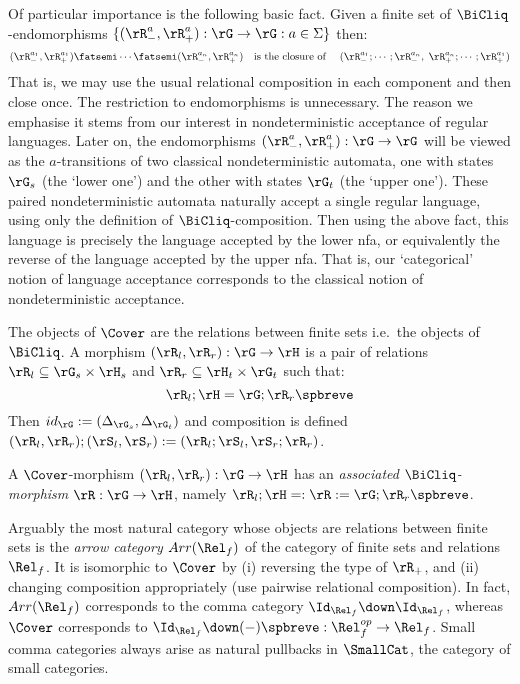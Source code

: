 \documentclass{article}
\begin{document}
\begin{motivation}
Of particular importance is the following basic fact. Given a finite set of $\BiCliq$-endomorphisms $\{ (\rR_-^a,\rR_+^a) : \rG \to \rG : a \in \Sigma \}$ then:
\[
(\rR_-^{a_1},\rR_+^{a_1}) \fatsemi \cdots \fatsemi (\rR_-^{a_n},\rR_+^{a_n})
\text{\quad is the closure of \quad}
(\rR_-^{a_1} ; \cdots ; \rR_-^{a_n},  \; \rR_+^{a_n} ; \cdots ; \rR_+^{a_1})
\]
That is, we may use the usual relational composition in each component and then close once. The restriction to endomorphisms is unnecessary. The reason we emphasise it stems from our interest in nondeterministic acceptance of regular languages. Later on, the endomorphisms $(\rR_-^a,\rR_+^a) : \rG \to \rG$ will be viewed as the $a$-transitions of two classical nondeterministic automata, one with states $\rG_s$ (the `lower one') and the other with states $\rG_t$ (the `upper one'). These paired nondeterministic automata naturally accept a single regular language, using only the definition of $\BiCliq$-composition. Then using the above fact, this language is precisely the language accepted by the lower nfa, or equivalently the reverse of the language accepted by the upper nfa. That is, our `categorical' notion of language acceptance corresponds to the classical notion of nondeterministic acceptance. \endbox
\end{motivation}


\begin{definition} 
The objects of $\Cover$ are the relations between finite sets i.e.\ the objects of $\BiCliq$. A morphism $(\rR_l,\rR_r) : \rG \to \rH$ is a pair of relations $\rR_l \subseteq \rG_s \times \rH_s$ and $\rR_r \subseteq \rH_t \times \rG_t$ such that:
\[
\rR_l ; \rH = \rG ; \rR_r\spbreve
\]
Then $id_\rG := (\Delta_{\rG_s},\Delta_{\rG_t})$ and composition is defined $(\rR_l,\rR_r);(\rS_l,\rS_r) := (\rR_l;\rS_l,\rS_r;\rR_r)$. \endbox
\end{definition}

\begin{definition}
A $\Cover$-morphism $(\rR_l,\rR_r) : \rG \to \rH$ has an \emph{associated $\BiCliq$-morphism} $\rR : \rG \to \rH$, namely $\rR_l ; \rH =: \rR := \rG ; \rR_r\spbreve$. \endbox
\end{definition}


\begin{note}
\label{note:category_cover}
Arguably the most natural category whose objects are relations between finite sets is the \emph{arrow category} $Arr(\Rel_f)$ of the category of finite sets and relations $\Rel_f$. It is isomorphic to $\Cover$ by (i) reversing the type of $\rR_+$, and (ii) changing composition appropriately (use pairwise relational composition). In fact, $Arr(\Rel_f)$ corresponds to the comma category $\Id_{\Rel_f} \down \Id_{\Rel_f}$, whereas $\Cover$ corresponds to $\Id_{\Rel_f} \down (-)\spbreve : \Rel_f^{op} \to \Rel_f$. Small comma categories always arise as natural pullbacks in $\SmallCat$, the category of small categories. \endbox
\end{note}
\end{document}
